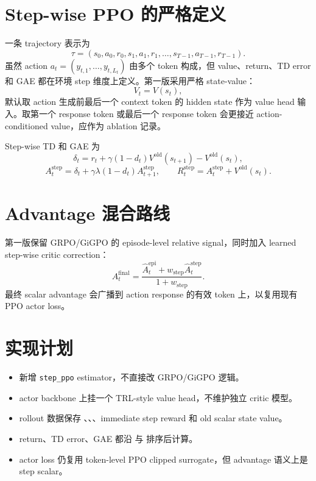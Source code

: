 \documentclass[10pt]{ctexart}
\begin{document}
\section*{Step-wise PPO 的严格定义}
一条 trajectory 表示为
\[
\tau=(s_0,a_0,r_0,s_1,a_1,r_1,\ldots,s_{T-1},a_{T-1},r_{T-1}).
\]
虽然 action $a_t=(y_{t,1},\ldots,y_{t,L_t})$ 由多个 token 构成，但 value、return、TD error 和 GAE 都在环境 step 维度上定义。第一版采用严格 state-value：
\[
V_t = V(s_t),
\]
默认取 action 生成前最后一个 context token 的 hidden state 作为 value head 输入。取第一个 response token 或最后一个 response token 会更接近 action-conditioned value，应作为 ablation 记录。

Step-wise TD 和 GAE 为
\[
\delta_t = r_t + \gamma(1-d_t)V^{\mathrm{old}}(s_{t+1}) - V^{\mathrm{old}}(s_t),
\]
\[
A_t^{\mathrm{step}} = \delta_t + \gamma\lambda(1-d_t)A_{t+1}^{\mathrm{step}},
\qquad
R_t^{\mathrm{step}} = A_t^{\mathrm{step}} + V^{\mathrm{old}}(s_t).
\]

\section*{Advantage 混合路线}
第一版保留 GRPO/GiGPO 的 episode-level relative signal，同时加入 learned step-wise critic correction：
\[
A_t^{\mathrm{final}}
= \frac{\widehat{A}_t^{\mathrm{epi}} + w_{\mathrm{step}}\widehat{A}_t^{\mathrm{step}}}{1+w_{\mathrm{step}}}.
\]
最终 scalar advantage 会广播到 action response 的有效 token 上，以复用现有 PPO actor loss。

\section*{实现计划}
\begin{itemize}
\item 新增 \texttt{step\_ppo} estimator，不直接改 GRPO/GiGPO 逻辑。
\item actor backbone 上挂一个 TRL-style value head，不维护独立 critic 模型。
\item rollout 数据保存 、、、immediate step reward 和 old scalar state value。
\item return、TD error、GAE 都沿  与  排序后计算。
\item actor loss 仍复用 token-level PPO clipped surrogate，但 advantage 语义上是 step scalar。
\end{itemize}
\end{document}
